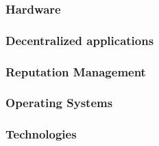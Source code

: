 \subsubsection{Hardware}



\subsubsection{Decentralized applications}

\subsubsection{Reputation Management}

\subsubsection{Operating Systems}

\subsubsection{Technologies}

